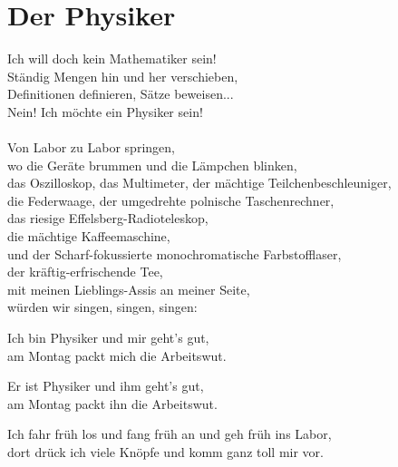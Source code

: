 \newpage
\section{Der Physiker}
\label{sec:physiker}
\charaktere{\Chor \Sing}
    
\begin{verseplay}[6em]
\s{\Sing} Ich will doch kein Mathematiker sein!\\
Ständig Mengen hin und her verschieben,\\
Definitionen definieren, Sätze beweisen...\\
Nein! Ich möchte ein Physiker sein!\\

\s{\Chor} \\

\s{\Sing} Von Labor zu Labor springen,\\
wo die Geräte brummen und die Lämpchen blinken,\\
das Oszilloskop, das Multimeter, der mächtige Teilchenbeschleuniger,\\
die Federwaage, der umgedrehte polnische Taschenrechner,\\
das riesige Effelsberg-Radioteleskop,\\
die mächtige Kaffeemaschine,\\
und der Scharf-fokussierte monochromatische Farbstofflaser,\\
der kräftig-erfrischende Tee,\\
mit meinen Lieblings-Assis an meiner Seite,\\
würden wir singen, singen, singen:\\

\s{\Chor} 

\s{\Sing} Ich bin Physiker und mir geht's gut,\\
am Montag packt mich die Arbeitswut.

\s{\Chor} Er ist Physiker und ihm geht's gut,\\
am Montag packt ihn die Arbeitswut.

\s{\Sing} Ich fahr früh los und fang früh an und geh früh ins Labor,\\
dort drück ich viele Knöpfe und komm ganz toll mir vor.


\end{verseplay}
